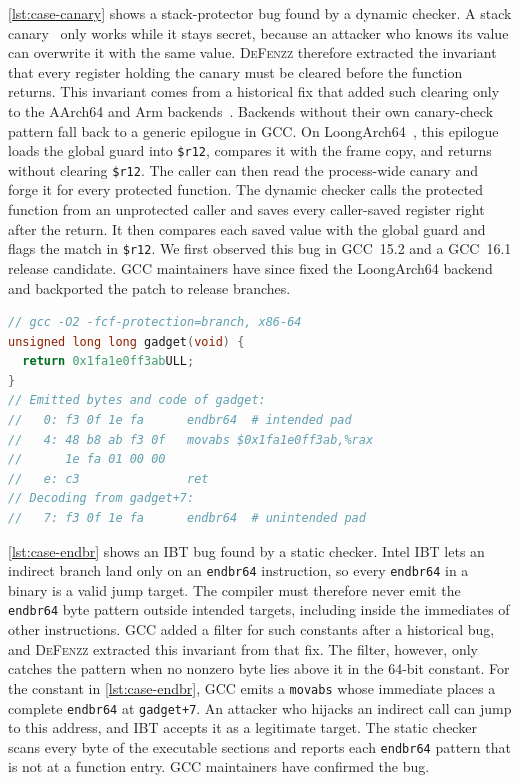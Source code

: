 \documentclass[conference,compsoc]{IEEEtran}
\begin{document}
\autoref{lst:case-canary} shows a stack-protector bug found by a dynamic checker. A stack canary~\cite{cowan1998stackguard} only works while it stays secret, because an attacker who knows its value can overwrite it with the same value. \textsc{DeFenzz} therefore extracted the invariant that every register holding the canary must be cleared before the function returns. This invariant comes from a historical fix that added such clearing only to the AArch64 and Arm backends~\cite{gccpr96191}. Backends without their own canary-check pattern fall back to a generic epilogue in GCC. On LoongArch64~\cite{loongarchabi}, this epilogue loads the global guard into \texttt{\$r12}, compares it with the frame copy, and returns without clearing \texttt{\$r12}. The caller can then read the process-wide canary and forge it for every protected function. The dynamic checker calls the protected function from an unprotected caller and saves every caller-saved register right after the return. It then compares each saved value with the global guard and flags the match in \texttt{\$r12}. We first observed this bug in GCC~15.2 and a GCC~16.1 release candidate. GCC maintainers have since fixed the LoongArch64 backend and backported the patch to release branches.

\begin{lstlisting}[float=t, language=C, numbers=none, xleftmargin=3pt, framexleftmargin=0pt, caption={Case study 2 (static checker): GCC hides an unintended \texttt{endbr64} landing pad inside a 64-bit immediate on x86-64.}, label={lst:case-endbr}]
// gcc -O2 -fcf-protection=branch, x86-64
unsigned long long gadget(void) {
  return 0x1fa1e0ff3abULL;
}
// Emitted bytes and code of gadget:
//   0: f3 0f 1e fa      endbr64  # intended pad
//   4: 48 b8 ab f3 0f   movabs $0x1fa1e0ff3ab,%rax
//      1e fa 01 00 00
//   e: c3               ret
// Decoding from gadget+7:
//   7: f3 0f 1e fa      endbr64  # unintended pad
\end{lstlisting}

\autoref{lst:case-endbr} shows an IBT bug found by a static checker. Intel IBT lets an indirect branch land only on an \texttt{endbr64} instruction, so every \texttt{endbr64} in a binary is a valid jump target. The compiler must therefore never emit the \texttt{endbr64} byte pattern outside intended targets, including inside the immediates of other instructions. GCC added a filter for such constants after a historical bug, and \textsc{DeFenzz} extracted this invariant from that fix. The filter, however, only catches the pattern when no nonzero byte lies above it in the 64-bit constant. For the constant in \autoref{lst:case-endbr}, GCC emits a \texttt{movabs} whose immediate places a complete \texttt{endbr64} at \texttt{gadget+7}. An attacker who hijacks an indirect call can jump to this address, and IBT accepts it as a legitimate target. The static checker scans every byte of the executable sections and reports each \texttt{endbr64} pattern that is not at a function entry. GCC maintainers have confirmed the bug.
\end{document}
